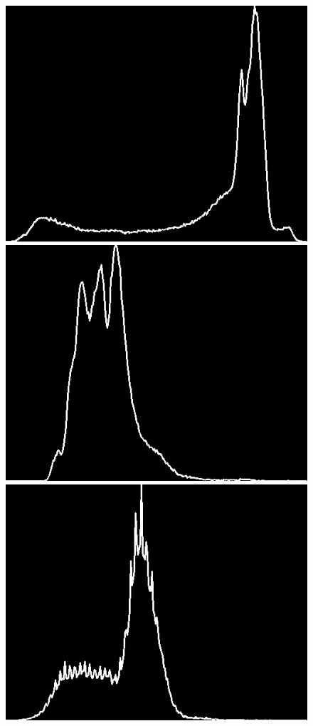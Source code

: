 \documentclass[12pt]{report}
\begin{document}
\begin{figure}[H]
\begin{center}
\includegraphics[scale=0.25]{../ImageRes/orig_histo_0.jpg} 
\includegraphics[scale=0.25]{../ImageRes/orig_histo_1.jpg} 
\includegraphics[scale=0.25]{../ImageRes/orig_histo_2.jpg} 

\end{center}
\end{figure}
\end{document}
